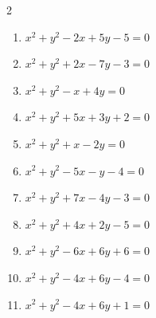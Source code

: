 \begin{multicols}{2}
\begin{enumerate}
  \item $x^{2}+y^{2}-2x+5y-5=0$


  \item $x^{2}+y^{2}+2x-7y-3=0$


  \item $x^{2}+y^{2}-x+4y=0$


  \item $x^{2}+y^{2}+5x+3y+2=0$


  \item $x^{2}+y^{2}+x-2y=0$


  \item $x^{2}+y^{2}-5x-y-4=0$


\columnbreak %

  \item $x^{2}+y^{2}+7x-4y-3=0$


  \item $x^{2}+y^{2}+4x+2y-5=0$


  \item $x^{2}+y^{2}-6x+6y+6=0$


  \item $x^{2}+y^{2}-4x+6y-4=0$


  \item $x^{2}+y^{2}-4x+6y+1=0$


\end{enumerate}
\end{multicols}
